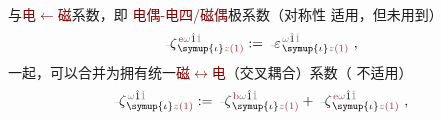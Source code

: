 与\textcolor{Maroon}{电$\longleftarrow$磁}系数，即 \textcolor{Maroon}{电偶-电四/磁偶}极系数（对称性  适用，但未用到）
\begin{align} \label{eq:p<-q/m}
	\Xint{\begin{smallmatrix} ~ \\ {}^{}_{\mathcolor{gray}{-}} \\ ~ \end{smallmatrix}}{12}{\zeta}^{\;\! \textcolor{Maroon}{\text{e}} \mathcolor{gray}{\omega} \hat{1} \mathcolor{gray}{\check{1}}}_{\;\! \symup{\iota} \mathcolor{gray}{z} \textcolor{Maroon}{(1)}} := \Xint{\begin{smallmatrix} ~ \\ {}^{}_{\mathcolor{gray}{-}} \\ ~ \end{smallmatrix}}{16}{\varepsilon}^{\;\! \mathcolor{gray}{\omega} \hat{1} \mathcolor{gray}{\check{1}}}_{\;\! \symup{\iota} \mathcolor{gray}{z} \textcolor{Maroon}{(1)}} ~,
\end{align}
一起，可以合并为拥有统一\textcolor{Maroon}{磁$\longleftrightarrow$电}（交叉耦合）系数\cite{welterTranslationallyInvariantSemiclassical2013}（ 不适用）
\begin{align} \label{eq:p<->m} %
	\Xint{\begin{smallmatrix} ~ \\ {}^{}_{\mathcolor{gray}{-}} \\ ~ \end{smallmatrix}}{12}{\zeta}^{\;\! \mathcolor{gray}{\omega} \hat{1} \mathcolor{gray}{\check{1}}}_{\;\! \symup{\iota} \mathcolor{gray}{z} \textcolor{Maroon}{(1)}} := \Xint{\begin{smallmatrix} ~ \\ {}^{}_{\mathcolor{gray}{-}} \\ ~ \end{smallmatrix}}{12}{\zeta}^{\;\! \textcolor{Maroon}{\text{b}} \mathcolor{gray}{\omega} \hat{1} \mathcolor{gray}{\check{1}}}_{\;\! \symup{\iota} \mathcolor{gray}{z} \textcolor{Maroon}{(1)}} + \Xint{\begin{smallmatrix} ~ \\ {}^{}_{\mathcolor{gray}{-}} \\ ~ \end{smallmatrix}}{12}{\zeta}^{\;\! \textcolor{Maroon}{\text{e}} \mathcolor{gray}{\omega} \hat{1} \mathcolor{gray}{\check{1}}}_{\;\! \symup{\iota} \mathcolor{gray}{z} \textcolor{Maroon}{(1)}} ~,
\end{align}
